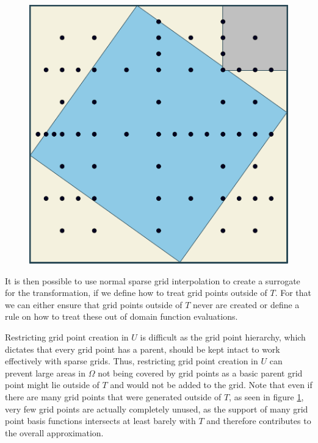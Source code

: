 \documentclass[
  a4paper,  %
  twoside,  %
  bibliography=totoc,
  headsepline,
  cleardoublepage=empty,
  parskip=half,
  draft=false
]{scrbook}
\begin{document}
\begin{mdframed}[style=style]
\begin{figure}[H]
        \centering
\begin{minipage}{.49\textwidth}
        \centering
\label{fig:aligned_grid}
    \end{minipage}%
    \begin{minipage}{0.49\textwidth}
        \centering
   \includegraphics[width=0.8\linewidth]{graphics/aligned_grid}
   \vspace{2mm}
    \end{minipage}
\end{figure}
\end{mdframed}
%
It is then possible to use normal sparse grid interpolation to create a surrogate for the transformation, if we define how to treat grid points outside of $T$.
For that we can either ensure that grid points outside of $T$ never are created or define a rule on how to treat these out of domain function evaluations.

Restricting grid point creation in $U$ is difficult as the grid point hierarchy, which dictates that every grid point has a parent, should be kept intact to work effectively with sparse grids.
Thus, restricting grid point creation in $U$ can prevent large areas in $\Omega$ not being covered by grid points as a basic parent grid point might lie outside of $T$ and would not be added to the grid.
Note that even if there are many grid points that were generated outside of $T$, as seen in figure \cref{fig:aligned_grid}, very few grid points are actually completely unused, as the support of many grid point basis functions intersects at least barely with $T$ and therefore contributes to the overall approximation.
\end{document}

